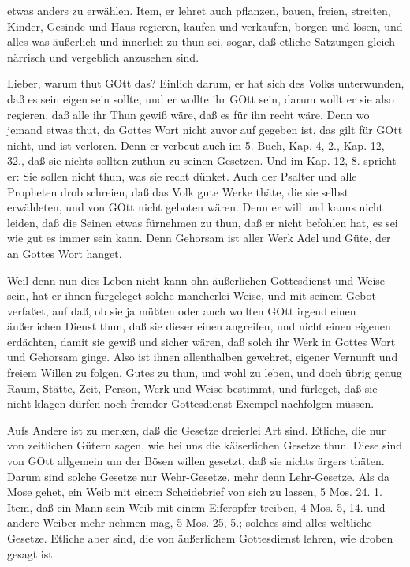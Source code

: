 
etwas anders zu erwählen. Item, er lehret auch pflanzen, bauen, freien, streiten, Kinder, Gesinde und Haus regieren, kaufen und verkaufen, borgen und lösen, und alles was äußerlich und innerlich zu thun sei, sogar, daß etliche Satzungen gleich närrisch und vergeblich anzusehen sind.

Lieber, warum thut GOtt das? Einlich darum, er hat sich des Volks unterwunden, daß es sein eigen sein sollte, und er wollte ihr GOtt sein, darum wollt er sie also regieren, daß alle ihr Thun gewiß wäre, daß es für ihn recht wäre. Denn wo jemand etwas thut, da Gottes Wort nicht zuvor auf gegeben ist, das gilt für GOtt nicht, und ist verloren. Denn er verbeut auch im 5. Buch, Kap. 4, 2., Kap. 12, 32., daß sie nichts sollten zuthun zu seinen Gesetzen. Und im Kap. 12, 8. spricht er: Sie sollen nicht thun, was sie recht dünket. Auch der Psalter und alle Propheten drob schreien, daß das Volk gute Werke thäte, die sie selbst erwähleten, und von GOtt nicht geboten wären. Denn er will und kanns nicht leiden, daß die Seinen etwas fürnehmen zu thun, daß er nicht befohlen hat, es sei wie gut es immer sein kann. Denn Gehorsam ist aller Werk Adel und Güte, der an Gottes Wort hanget.

Weil denn nun dies Leben nicht kann ohn äußerlichen Gottesdienst und Weise sein, hat er ihnen fürgeleget solche mancherlei Weise, und mit seinem Gebot verfaßet, auf daß, ob sie ja müßten oder auch wollten GOtt irgend einen äußerlichen Dienst thun, daß sie dieser einen angreifen, und nicht einen eigenen erdächten, damit sie gewiß und sicher wären, daß solch ihr Werk in Gottes Wort und Gehorsam ginge. Also ist ihnen allenthalben gewehret, eigener Vernunft und freiem Willen zu folgen, Gutes zu thun, und wohl zu leben, und doch übrig genug Raum, Stätte, Zeit, Person, Werk und Weise bestimmt, und fürleget, daß sie nicht klagen dürfen noch fremder Gottesdienst Exempel nachfolgen müssen.

Aufs Andere ist zu merken, daß die Gesetze dreierlei Art sind. Etliche, die nur von zeitlichen Gütern sagen, wie bei uns die käiserlichen Gesetze thun. Diese sind von GOtt allgemein um der Bösen willen gesetzt, daß sie nichts ärgers thäten. Darum sind solche Gesetze nur Wehr-Gesetze, mehr denn Lehr-Gesetze. Als da Mose gehet, ein Weib mit einem Scheidebrief von sich zu lassen, 5 Mos. 24. 1. Item, daß ein Mann sein Weib mit einem Eiferopfer treiben, 4 Mos. 5, 14. und andere Weiber mehr nehmen mag, 5 Mos. 25, 5.; solches sind alles weltliche Gesetze. Etliche aber sind, die von äußerlichem Gottesdienst lehren, wie droben gesagt ist.

